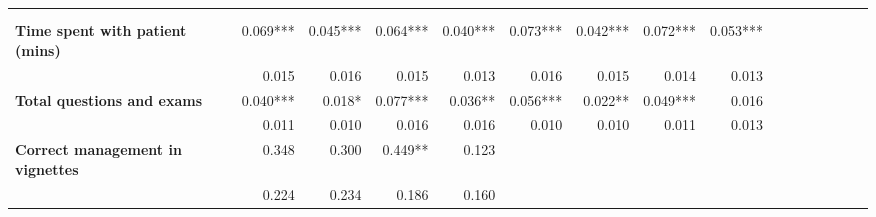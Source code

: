 \begin{tabular}{@{\extracolsep{5pt}}lrrrrrrrrrrrrrrr}
\toprule
&  &  &  &  &  &  &  &  \\
{\bf } &  &  &  &  &  &  &  &  \\
\hline
{\bf Time spent with patient (mins)} & 0.069*** & 0.045*** & 0.064*** & 0.040*** & 0.073*** & 0.042*** & 0.072*** & 0.053*** \\
{\bf } & 0.015\phantom{***} & 0.016\phantom{***} & 0.015\phantom{***} & 0.013\phantom{***} & 0.016\phantom{***} & 0.015\phantom{***} & 0.014\phantom{***} & 0.013\phantom{***} \\
{\bf Total questions and exams} & 0.040*** & 0.018*\phantom{**} & 0.077*** & 0.036**\phantom{*} & 0.056*** & 0.022**\phantom{*} & 0.049*** & 0.016\phantom{***} \\
{\bf } & 0.011\phantom{***} & 0.010\phantom{***} & 0.016\phantom{***} & 0.016\phantom{***} & 0.010\phantom{***} & 0.010\phantom{***} & 0.011\phantom{***} & 0.013\phantom{***} \\
{\bf Correct management in vignettes} & 0.348\phantom{***} & 0.300\phantom{***} & 0.449**\phantom{*} & 0.123\phantom{***} & \phantom{***} & \phantom{***} & \phantom{***} & \phantom{***} \\
{\bf } & 0.224\phantom{***} & 0.234\phantom{***} & 0.186\phantom{***} & 0.160\phantom{***} & \phantom{***} & \phantom{***} & \phantom{***} & \phantom{***} \\

\end{tabular}
